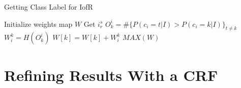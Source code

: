 \documentclass[10pt,twocolumn,letterpaper]{article}
\begin{document}
\begin{figure}
\centering
\label{fig:votation}
\end{figure}

\begin{algorithm}
\caption{Getting Class Label for IofR}
\begin{algorithmic}
\STATE Initialize weights map $W$
\STATE Get $i_r^s$
\STATE $O_k^i = \#\{P(c_i=t|I) > P(c_i=k|I)\}_{t\neq{k}}$
\STATE $W_i^k = H(O_k^i)$
\STATE $W[k] = W[k] + W_i^k$
\ENDFOR
\ENDFOR
\RETURN $MAX(W)$
\end{algorithmic}
\label{alg:votation}
\end{algorithm}

\section{Refining Results With a CRF}\label{sectionCRF}
\end{document}
